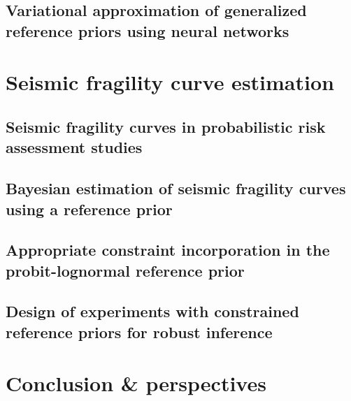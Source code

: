 \documentclass[a4paper]{book}
\begin{document}



\chapter{Variational approximation of generalized reference priors using neural networks}\label{chap:varp}




\part{Seismic fragility curve estimation}\label{part:spra}


\chapter{Seismic fragility curves in probabilistic risk assessment studies}\label{chap:frags-intro}




\chapter{Bayesian estimation of seismic fragility curves using a reference prior}\label{chap:prem}




\chapter{Appropriate constraint incorporation in the probit-lognormal reference prior%
}\label{chap:constrained-frags}




\chapter{Design of experiments with constrained reference priors for robust inference%
}\label{chap:doe}






\part{Conclusion \& perspectives}\label{part:conclusion}
\end{document}
